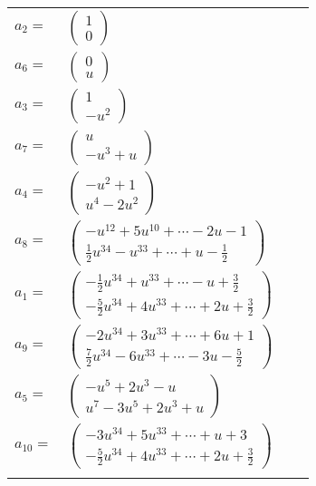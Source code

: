 \documentclass[1p]{elsarticle_modified}
\theoremstyle{definition}
\begin{document}
\begin{tabular}{m{7pt} m{180pt} m{7pt} m{180pt} }
\flushright $a_{2}=$&$\begin{pmatrix}1\\0\end{pmatrix}$ \\
\flushright $a_{6}=$&$\begin{pmatrix}0\\u\end{pmatrix}$ \\
\flushright $a_{3}=$&$\begin{pmatrix}1\\- u^2\end{pmatrix}$ \\
\flushright $a_{7}=$&$\begin{pmatrix}u\\- u^3+u\end{pmatrix}$ \\
\flushright $a_{4}=$&$\begin{pmatrix}- u^2+1\\u^4-2 u^2\end{pmatrix}$ \\
\flushright $a_{8}=$&$\begin{pmatrix}- u^{12}+5 u^{10}+\cdots-2 u-1\\\frac{1}{2} u^{34}- u^{33}+\cdots+u-\frac{1}{2}\end{pmatrix}$ \\
\flushright $a_{1}=$&$\begin{pmatrix}-\frac{1}{2} u^{34}+u^{33}+\cdots- u+\frac{3}{2}\\-\frac{5}{2} u^{34}+4 u^{33}+\cdots+2 u+\frac{3}{2}\end{pmatrix}$ \\
\flushright $a_{9}=$&$\begin{pmatrix}-2 u^{34}+3 u^{33}+\cdots+6 u+1\\\frac{7}{2} u^{34}-6 u^{33}+\cdots-3 u-\frac{5}{2}\end{pmatrix}$ \\
\flushright $a_{5}=$&$\begin{pmatrix}- u^5+2 u^3- u\\u^7-3 u^5+2 u^3+u\end{pmatrix}$ \\
\flushright $a_{10}=$&$\begin{pmatrix}-3 u^{34}+5 u^{33}+\cdots+u+3\\-\frac{5}{2} u^{34}+4 u^{33}+\cdots+2 u+\frac{3}{2}\end{pmatrix}$\\&\end{tabular}
\end{document}
